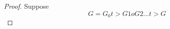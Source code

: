 \documentclass[../main-sheet.tex]{subfiles}
\begin{document}
\begin{proof}
    Suppose \[G = G_0 t> G1 o G2 ... t> G\]
\end{proof}
\end{document}
